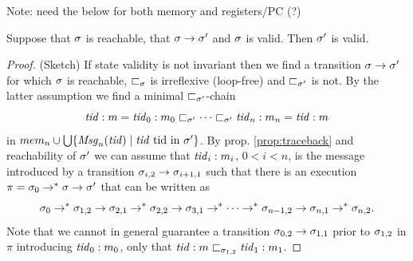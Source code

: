 Note: need the below for both memory and registers/PC (?)

\begin{theorem}
\label{thm:validityPreservation}
Suppose that $\sigma$ is reachable, that $\sigma\rightarrow \sigma'$ and $\sigma$ is valid. Then $\sigma'$ is valid.
\end{theorem}
\begin{proof}
(Sketch)
If state validity is not invariant then we find a transition
$\sigma\rightarrow \sigma'$ for which $\sigma$ is reachable, $\sqsubset_{\sigma}$ is irreflexive (loop-free) and $\sqsubset_{\sigma'}$ is not.
By the latter assumption we find a minimal $\sqsubset_{\sigma'}$-chain
\begin{equation}
\label{eq:chain}
\mathit{tid}: m = \mathit{tid}_0: m_0\sqsubset_{\sigma'}\cdots \sqsubset_{\sigma'}\mathit{tid}_n: m_n = \mathit{tid}: m
\end{equation}
in $mem_n\cup\bigcup\{\mathit{Msg}_n(\mathit{tid})\mid \mathit{tid}\mbox{ tid in }\sigma'\}$.
By prop. \ref{prop:traceback} and reachability of $\sigma'$ we can assume that $\mathit{tid}_i: m_i$, $0 < i < n$, is the message introduced by a transition
$\sigma_{i,2}\rightarrow \sigma_{i+1,1}$ such that there is an execution
$\pi = \sigma_0\rightarrow^* \sigma\rightarrow\sigma'$ that can be written as
\begin{equation}
\label{eq:chaincomp}
\sigma_0\rightarrow^*\sigma_{1,2}\rightarrow\sigma_{2,1}\rightarrow^*\sigma_{2,2}\rightarrow\sigma_{3,1}\rightarrow^* \cdots \rightarrow^*\sigma_{n-1,2}\rightarrow \sigma_{n,1}\rightarrow^*\sigma_{n,2}.
\end{equation}
Note that we cannot in general guarantee
a transition $\sigma_{0,2}\rightarrow\sigma_{1,1}$ prior to $\sigma_{1,2}$ in $\pi$ introducing $\mathit{tid}_0: m_0$, only that $\mathit{tid}: m\sqsubset_{\sigma_{1,2}}\mathit{tid}_1: m_1$.


\end{proof}

